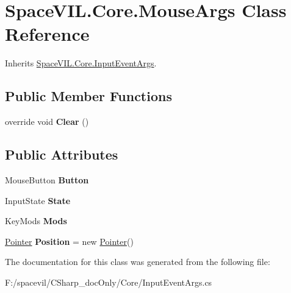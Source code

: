 \hypertarget{class_space_v_i_l_1_1_core_1_1_mouse_args}{}\section{Space\+V\+I\+L.\+Core.\+Mouse\+Args Class Reference}
\label{class_space_v_i_l_1_1_core_1_1_mouse_args}


Inherits \mbox{\hyperlink{class_space_v_i_l_1_1_core_1_1_input_event_args}{Space\+V\+I\+L.\+Core.\+Input\+Event\+Args}}.

\subsection*{Public Member Functions}
\begin{DoxyCompactItemize}
\item 
\mbox{\label{class_space_v_i_l_1_1_core_1_1_mouse_args_a5cfcaa3655f01b0aab43bc6904f37b79}} 
override void {\bfseries Clear} ()
\end{DoxyCompactItemize}
\subsection*{Public Attributes}
\begin{DoxyCompactItemize}
\item 
\mbox{\label{class_space_v_i_l_1_1_core_1_1_mouse_args_af319bfab5c281eb6500b6a9817d58960}} 
Mouse\+Button {\bfseries Button}
\item 
\mbox{\label{class_space_v_i_l_1_1_core_1_1_mouse_args_a3f4854e5ff400b7c9c9db431ccfbae0a}} 
Input\+State {\bfseries State}
\item 
\mbox{\label{class_space_v_i_l_1_1_core_1_1_mouse_args_a581f3c72b6e296a10208fb0965c1be8c}} 
Key\+Mods {\bfseries Mods}
\item 
\mbox{\label{class_space_v_i_l_1_1_core_1_1_mouse_args_aa90d315915d577763e4296448c8b344d}} 
\mbox{\hyperlink{class_space_v_i_l_1_1_core_1_1_pointer}{Pointer}} {\bfseries Position} = new \mbox{\hyperlink{class_space_v_i_l_1_1_core_1_1_pointer}{Pointer}}()
\end{DoxyCompactItemize}


The documentation for this class was generated from the following file\+:\begin{DoxyCompactItemize}
\item 
F\+:/spacevil/\+C\+Sharp\+\_\+doc\+Only/\+Core/Input\+Event\+Args.\+cs\end{DoxyCompactItemize}
